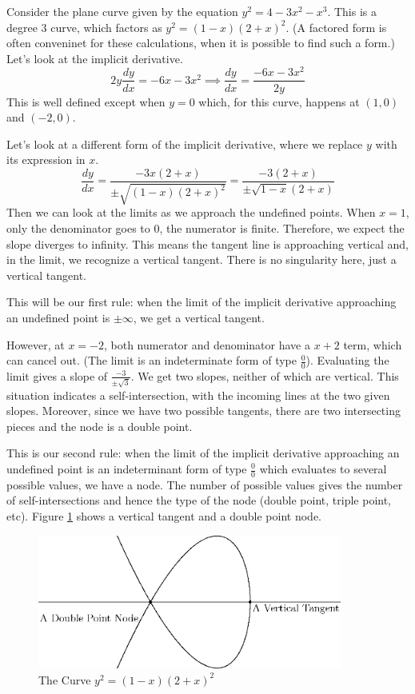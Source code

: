 \documentclass[fleqn]{report}
\begin{document}
\begin{example}Consider the plane curve given by the equation
$y^2 = 4 - 3x^2 - x^3$. This is a degree 3 curve, which
factors as $y^2 = (1-x)(2+x)^2$. (A factored form is often
conveninet for these calculations, when it is possible to find
such a form.) Let's look at the implicit derivative.
\begin{equation*}
2 y \frac{dy}{dx} = -6x - 3x^2 \implies \frac{dy}{dx} =
\frac{-6x-3x^2}{2y}
\end{equation*}
This is well defined except when $y=0$ which, for this curve,
happens at $(1,0)$ and $(-2,0)$.

Let's look at a different form of the implicit derivative,
where we replace $y$ with its expression in $x$.
\begin{equation*}
\frac{dy}{dx} = \frac{-3x(2+x)}{\pm\sqrt{(1-x)(2+x)^2}} =
\frac{-3(2+x)}{\pm\sqrt{1-x} (2+x)}
\end{equation*}
Then we can look at the limits as we approach the undefined
points. When $x=1$, only the denominator goes to $0$, the
numerator is finite. Therefore, we expect the slope diverges to
infinity. This means the tangent line is approaching 
vertical and, in the limit, we recognize a vertical tangent.
There is no singularity here, just a vertical tangent.

This will be our first rule: when the limit of the implicit
derivative approaching an undefined point is $\pm \infty$, we
get a vertical tangent.

However, at $x=-2$, both numerator and denominator have a
$x+2$ term, which can cancel out. (The limit is an
indeterminate form of type $\frac{0}{0}$). Evaluating the
limit gives a slope of $\frac{-3}{\pm\sqrt{3}}$. We get two
slopes, neither of which are vertical. This situation indicates a
self-intersection, with the incoming lines at the two given
slopes. Moreover, since we have two possible tangents, there
are two intersecting pieces and the node is a double point.

This is our second rule: when the limit of the implicit
derivative approaching an undefined point is an indeterminant
form of type $\frac{0}{0}$ which evaluates to several possible
values, we have a node. The number of possible values gives
the number of self-intersections and hence the type of the
node (double point, triple point, etc). Figure
\ref{figure-elliptic-curve1} shows a vertical tangent and a double
point node.
\end{example}

\begin{figure}[ht]
\centering
\includegraphics[width=10cm]{figure05.eps}
\caption{The Curve $y^2 = (1-x)(2+x)^2$}
\label{figure-elliptic-curve1}
\end{figure}
\end{document}
